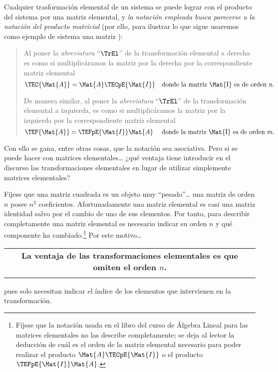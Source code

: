 \documentclass[11pt]{report}
\begin{document}
Cualquier trasformación elemental de un sistema se puede lograr con el
producto del sistema por una matriz elemental, y \emph{la notación empleada
busca parecerse a la notación del producto matricial} (por ello, para
ilustrar lo que sigue usaremos como ejemplo de sistema una matriz
):
\begin{quotation}
  Al poner la \emph{abreviatura} ``$\TrEl$'' de la
  transformación elemental a derecha es como si multiplicáramos la
  matriz  por la derecha por la correspondiente matriz
  elemental
  \begin{displaymath}
    \TEC{\Mat{A}}=\Mat{A}\TECpE{\Mat{I}}\quad \text{donde la matriz \Mat{I} es de orden $n$}.
  \end{displaymath}

  De manera similar, al poner la \emph{abreviatura} ``$\TrEl$''
  de la transformación elemental a izquierda, es como si
  multiplicáramos la matriz  por la izquierda por la
  correspondiente matriz elemental
  \begin{displaymath}
    \TEF{\Mat{A}}=\TEFpE{\Mat{I}}\Mat{A}\quad \text{ donde la matriz \Mat{I} es de orden $m$}.
  \end{displaymath}
\end{quotation}
Con ello se gana, entre otras cosas, que la notación sea
asociativa. Pero si se puede hacer con matrices elementales\dots{} ¿qué
ventaja tiene introducir en el discurso las transformaciones
elementales en lugar de utilizar simplemente matrices elementales?

Fíjese que una matriz cuadrada es un objeto muy ``pesado''\dots{} una
matriz de orden \(n\) posee \(n^2\) coeficientes. Afortunadamente una
matriz elemental es casi una matriz identidad salvo por el cambio de
uno de sus elementos. Por tanto, para describir completamente una
matriz elemental es necesario indicar su orden \(n\) y qué componente ha
cambiado.\footnote{Fíjese que la notación usada en el libro del curso de
Álgebra Lineal para las matrices elementales no las describe
completamente; se deja al lector la deducción de cuál es el orden de
la matriz elemental necesario para poder realizar el producto
\(\Mat{A}\TECpE{\Mat{I}}\) o el producto \(\TEFpE{\Mat{I}}\Mat{A}\).}  Por
este motivo\ldots{}

\begin{center}
\begin{tabular}{c}
\textbf{La ventaja de las transformaciones elementales es que omiten el orden \(n\).}\\
\\
\end{tabular}
\end{center}
pues solo necesitan indicar el índice de los elementos que intervienen
en la transformación.
\end{document}
